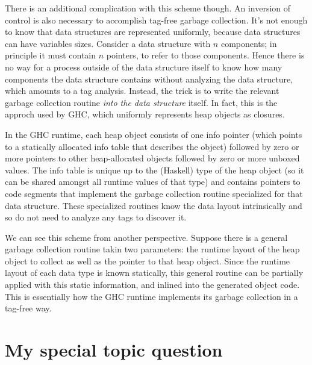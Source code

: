 \documentclass[letterpaper,11pt]{article}
\begin{document}
There is an additional complication with this scheme though. An inversion of
control is also necessary to accomplish tag-free garbage collection. It's not
enough to know that data structures are represented uniformly, because data
structures can have variables sizes. Consider a data structure with $n$
components; in principle it must contain $n$ pointers, to refer to those
components. Hence there is no way for a process outside of the data structure
itself to know how many components the data structure contains without
analyzing the data structure, which amounts to a tag analysis. Instead, the
trick is to write the relevant garbage collection routine \emph{into the data
structure} itself. In fact, this is the approch used by GHC, which uniformly
represents heap objects as closures.

In the GHC runtime, each heap object consists of one info pointer (which points
to a statically allocated info table that describes the object) followed by
zero or more pointers to other heap-allocated objects followed by zero or more
unboxed values\footnotemark. The info table is unique up to the (Haskell) type
of the heap object (so it can be shared amongst all runtime values of that
type) and contains pointers to code segments that implement the garbage
collection routine specialized for that data structure. These specialized
routines know the data layout intrinsically and so do not need to analyze any
tags to discover it.

We can see this scheme from another perspective. Suppose there is a general
garbage collection routine takin two parameters: the runtime layout of the heap
object to collect as well as the pointer to that heap object. Since the runtime
layout of each data type is known statically, this general routine can be
partially applied with this static information, and inlined into the generated
object code. This is essentially how the GHC runtime implements its garbage
collection in a tag-free way.


\section{My special topic question}
\end{document}
